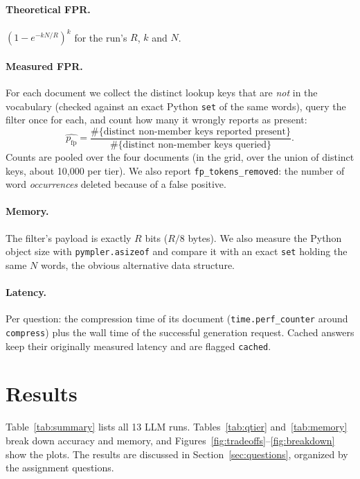 \documentclass[11pt]{article}
\newcommand{\code}[1]{\texttt{#1}}
\newcommand{\pfp}{p_{\mathrm{fp}}}
\begin{document}
\paragraph{Theoretical FPR.} $(1-e^{-kN/R})^k$ for the run's $R$, $k$ and $N$.

\paragraph{Measured FPR.} For each document we collect the distinct lookup keys that are
\emph{not} in the vocabulary (checked against an exact Python \code{set} of the same words), query
the filter once for each, and count how many it wrongly reports as present:
\[
  \widehat{\pfp} = \frac{\#\{\text{distinct non-member keys reported present}\}}
                        {\#\{\text{distinct non-member keys queried}\}}.
\]
Counts are pooled over the four documents (in the grid, over the union of distinct keys, about
10{,}000 per tier). We also report \code{fp\_tokens\_removed}: the number of word
\emph{occurrences} deleted because of a false positive.

\paragraph{Memory.} The filter's payload is exactly $R$ bits ($R/8$ bytes). We also measure the
Python object size with \code{pympler.asizeof} and compare it with an exact \code{set} holding the same
$N$ words, the obvious alternative data structure.

\paragraph{Latency.} Per question: the compression time of its document
(\code{time.perf\_counter} around \code{compress}) plus the wall time of the successful generation
request. Cached answers keep their originally measured latency and are flagged \code{cached}.

\section{Results}
\label{sec:results}

Table~\ref{tab:summary} lists all 13 LLM runs. Tables~\ref{tab:qtier} and~\ref{tab:memory} break
down accuracy and memory, and Figures~\ref{fig:tradeoffs}--\ref{fig:breakdown} show the plots. The
results are discussed in Section~\ref{sec:questions}, organized by the assignment questions.
\end{document}
